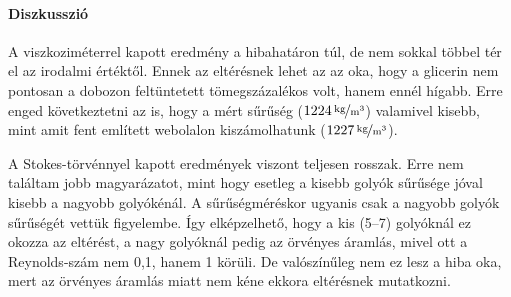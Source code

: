 \documentclass[12pt]{article}
\begin{document}
\paragraph{Diszkusszió}

A viszkoziméterrel kapott eredmény a hibahatáron túl, de nem sokkal többel tér el az irodalmi értéktől. Ennek az eltérésnek lehet az az oka, hogy a glicerin nem pontosan a dobozon feltüntetett tömegszázalékos volt, hanem ennél hígabb. Erre enged következtetni az is, hogy a mért sűrűség ($\unitfrac[1224]{kg}{m^3}$) valamivel kisebb, mint amit fent említett webolalon kiszámolhatunk ($\unitfrac[1227]{kg}{m^3}$).

A Stokes-törvénnyel kapott eredmények viszont teljesen rosszak. Erre nem találtam jobb ma\-gyarázatot, mint hogy esetleg a kisebb golyók sűrűsége jóval kisebb a nagyobb golyókénál. A sűrűségméréskor ugyanis csak a nagyobb golyók sűrűségét vettük figyelembe. Így elképzelhető, hogy a kis (5--7) golyóknál ez okozza az eltérést, a nagy golyóknál pedig az örvényes áramlás, mivel ott a Reynolds-szám nem 0,1, hanem 1 körüli. De valószínűleg nem ez lesz a hiba oka, mert az örvényes áramlás miatt nem kéne ekkora eltérésnek mutatkozni.
\end{document}
